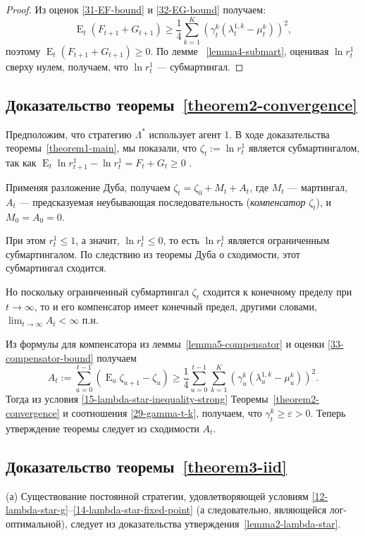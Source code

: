 \documentclass[a4paper,12pt,russian]{article} %
\theoremstyle{definition}
\DeclareMathOperator{\E}{E}
\renewcommand{\epsilon}{\varepsilon}
\begin{document}
\begin{proof}
Из оценок \eqref{31-EF-bound} и \eqref{32-EG-bound} получаем:
\begin{equation}
\label{33-compensator-bound}
\E_t(F_{t+1}+G_{t+1}) 
\ge \frac14 \sum_{k=1}^K (\gamma_{t}^k(\lambda_{t}^{1,k} - \mu_{t}^k))^2,
\end{equation}
поэтому $\E_t (F_{t+1}+G_{t+1})\ge 0$.
По лемме ~\ref{lemma4-submart}, оценивая $\ln r_t^1$ сверху нулем, получаем, что $\ln r_t^1$ — субмартингал. 

\end{proof}

\subsection{Доказательство теоремы~\ref{theorem2-convergence}}
Предположим, что стратегию $\Lambda^*$ использует агент 1.
В ходе доказательства теоремы~\ref{theorem1-main}, мы показали, что $\zeta_t:=\ln r_t^1$ является субмартингалом, так как $\E_{t}\ln r_{t+1}^1 - \ln r_{t}^1=F_t + G_t \geq 0$ . 

Применяя разложение Дуба, получаем $\zeta_t = \zeta_0 + M_t + A_t$, где $M_t$ — мартингал, $A_t$ — предсказуемая неубывающая последовательность (\emph{компенсатор} $\zeta_t$), и $M_0=A_0=0$.

При этом $r_t^1 \leq 1$, а значит, $\ln r_t^1 \leq 0$, то есть $\ln r_t^1$ является ограниченным субмартингалом. По следствию из теоремы Дуба о сходимости, этот субмартингал сходится.

Но поскольку ограниченный субмартингал $\zeta_t$ сходится к конечному пределу при $t\to\infty$, то и его компенсатор имеет конечный предел, другими словами, \ $\lim_{t\to\infty} A_t < \infty$ п.н.

Из формулы для компенсатора из леммы~\ref{lemma5-compensator} и оценки \eqref{33-compensator-bound} получаем
\[
A_t := \sum_{u=0}^{t-1} (\E_u\zeta_{u+1} - \zeta_u) 
\ge \frac14 \sum_{u=0}^{t-1} 
  \sum_{k=1}^K (\gamma_{u}^k(\lambda_{u}^{1,k} - \mu_{u}^k))^2.
\]
Тогда из условия \eqref{15-lambda-star-inequality-strong} Теоремы~\ref{theorem2-convergence} и соотношения \eqref{29-gamma-t-k}, получаем, что $\gamma_{t}^k\ge \epsilon>0$.
Теперь утверждение теоремы следует из сходимости $A_t$.





\subsection{Доказательство теоремы~\ref{theorem3-iid}}
(а) Существование постоянной стратегии, удовлетворяющей условиям \eqref{12-lambda-star-g}--\eqref{14-lambda-star-fixed-point} (а следовательно, являющейся лог-оптимальной), следует из доказательства утверждения~\ref{lemma2-lambda-star}.
\end{document}
